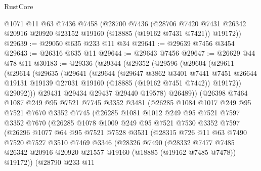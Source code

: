 \begin{lexlean}{RustCore}
\begin{coremodule}
    @1071
    @11
    @63
    @7436
    @7458
    (@28700
      @7436
      (@28706 @7420 @7431 @26342 @20916 @20920 @23152 @19160 (@18885 (@19162 @7431 @7421)) @19172))
@29639 := @29050 @635 @233 @11 @34
@29641 := @29639 @7456 @3454
@29643 := @26316 @635 @11
@29644 := @29643 @7456
@29647 := @26629 @44 @78 @11
@30183 := @29336
    (@29344
      (@29352
        (@29596
          (@29604
            (@29611
              (@29614
                (@29635
                  (@29641
                    (@29644
                      (@29647
                        @3862
                        @3401
                        @7441
                        @7451
                        @26644
                        @19131
                        @19139
                        @27031
                        @19160
                        (@18885 (@19162 @7451 @7442))
                        @19172))
                    @29092)))
              @29431
              @29434
              @29437
              @29440
              @19578)
            @26489))
        (@26398
          @7464
          @1087
          @249
          @95
          @7521
          @7745
          @3352
          @3481
          (@26285
            @1084
            @1017
            @249
            @95
            @7521
            @7670
            @3352
            @7745
            (@26285
              @1081
              @1012
              @249
              @95
              @7521
              @7597
              @3352
              @7670
              (@26285
                @1078
                @1009
                @249
                @95
                @7521
                @7530
                @3352
                @7597
                (@26296
                  @1077
                  @64
                  @95
                  @7521
                  @7528
                  @3531
                  (@28315
                    @726
                    @11
                    @63
                    @7490
                    @7520
                    @7527
                    @3510
                    @7469
                    @3346
                    (@28326
                      @7490
                      (@28332
                        @7477
                        @7485
                        @26342
                        @20916
                        @20920
                        @21557
                        @19160
                        (@18885 (@19162 @7485 @7478))
                        @19172))
                    (@28790
                      @233
                      @11

\end{coremodule}
\end{lexlean}
